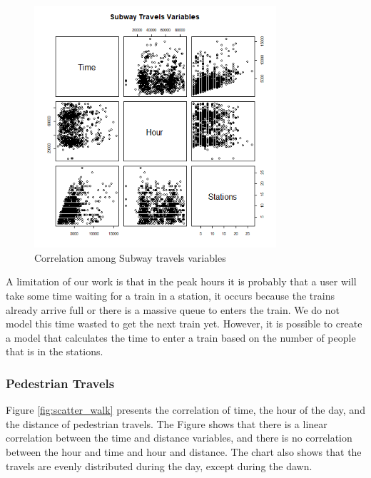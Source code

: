 \begin{figure}[!htb]
\centering
\includegraphics[width=0.8\textwidth]{figuras/chap-sp/scatter_subway.png}
\caption{Correlation among Subway travels variables}
\label{fig:scatter_subway}
\end{figure}

A limitation of our work is that in the peak hours it is probably that a user will take some time waiting for a train in a station, it occurs because the trains already arrive full or there is a massive queue to enters the train. We do not model this time wasted to get the next train yet. However, it is possible to create a model that calculates the time to enter a train based on the number of people that is in the stations.

\subsubsection{Pedestrian Travels}

Figure \ref{fig:scatter_walk} presents the correlation of time, the hour of the day, and the distance of pedestrian travels. The Figure shows that there is a linear correlation between the time and distance variables, and there is no correlation between the hour and time and hour and distance. The chart also shows that the travels are evenly distributed during the day, except during the dawn.

